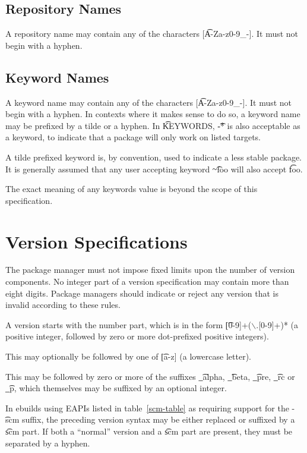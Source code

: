 \subsection{Repository Names}
\label{repository-names}
A repository name may contain any of the characters [\t{A-Za-z0-9\_-}]. It must not begin with a
hyphen.

\subsection{Keyword Names}
\label{keyword-names}
A keyword name may contain any of the characters [\t{A-Za-z0-9\_-}]. It must not begin with a
hyphen. In contexts where it makes sense to do so, a keyword name may be prefixed by
a tilde or a hyphen. In \t{KEYWORDS}, \t{-*} is also acceptable as a keyword, to indicate that
a package will only work on listed targets.

A tilde prefixed keyword is, by convention, used to indicate a less stable package. It is generally
assumed that any user accepting keyword \t{\textasciitilde{}foo} will also accept \t{foo}.

The exact meaning of any keywords value is beyond the scope of this specification.

\section{Version Specifications}
The package manager must not impose fixed limits upon the number of version components. No
integer part of a version specification may contain more than eight digits. Package managers should
indicate or reject any version that is invalid according to these rules.

A version starts with the number part, which is in the form \t{[0-9]+($\backslash$.[0-9]+)*} (a positive
integer, followed by zero or more dot-prefixed positive integers).

This may optionally be followed by one of \t{[a-z]} (a lowercase letter).

This may be followed by zero or more of the suffixes \t{\_alpha}, \t{\_beta}, \t{\_pre},
\t{\_rc} or \t{\_p}, which themselves may be suffixed by an optional integer.

\IFKDEBUILDELSE
{
    In ebuilds using EAPIs listed in table~\ref{scm-table} as requiring support for the \t{-scm}
    suffix, the preceding version syntax may be either replaced or suffixed by a \t{scm} part. If
    both a ``normal'' version and a \t{scm} part are present, they must be separated by a hyphen.
}{
}

